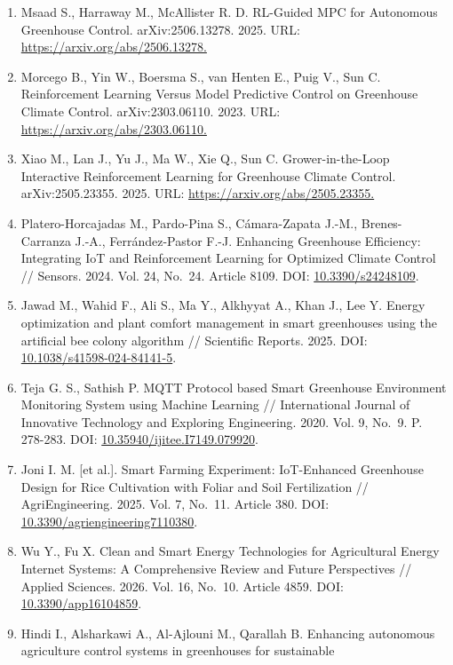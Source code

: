 \documentclass[a4paper,14pt]{extarticle}
\begin{document}
\begin{enumerate}
\item
  Msaad S., Harraway M., McAllister R. D. RL-Guided MPC for Autonomous
  Greenhouse Control. arXiv:2506.13278. 2025. URL:
  \url{https://arxiv.org/abs/2506.13278.}
\item
  Morcego B., Yin W., Boersma S., van Henten E., Puig V., Sun C.
  Reinforcement Learning Versus Model Predictive Control on Greenhouse
  Climate Control. arXiv:2303.06110. 2023. URL:
  \url{https://arxiv.org/abs/2303.06110.}
\item
  Xiao M., Lan J., Yu J., Ma W., Xie Q., Sun C. Grower-in-the-Loop
  Interactive Reinforcement Learning for Greenhouse Climate Control.
  arXiv:2505.23355. 2025. URL: \url{https://arxiv.org/abs/2505.23355.}
\item
  Platero-Horcajadas M., Pardo-Pina S., Cámara-Zapata J.-M.,
  Brenes-Carranza J.-A., Ferrández-Pastor F.-J. Enhancing Greenhouse
  Efficiency: Integrating IoT and Reinforcement Learning for Optimized
  Climate Control // Sensors. 2024. Vol. 24, No.~24. Article 8109. DOI:
  \href{https://doi.org/10.3390/s24248109}{10.3390/s24248109}.
\item
  Jawad M., Wahid F., Ali S., Ma Y., Alkhyyat A., Khan J., Lee Y. Energy
  optimization and plant comfort management in smart greenhouses using
  the artificial bee colony algorithm // Scientific Reports. 2025. DOI:
  \href{https://doi.org/10.1038/s41598-024-84141-5}{10.1038/s41598-024-84141-5}.
\item
  Teja G. S., Sathish P. MQTT Protocol based Smart Greenhouse
  Environment Monitoring System using Machine Learning // International
  Journal of Innovative Technology and Exploring Engineering. 2020. Vol.
  9, No.~9. P. 278-283. DOI:
  \href{https://doi.org/10.35940/ijitee.I7149.079920}{10.35940/ijitee.I7149.079920}.
\item
  Joni I. M. {[}et al.{]}. Smart Farming Experiment: IoT-Enhanced
  Greenhouse Design for Rice Cultivation with Foliar and Soil
  Fertilization // AgriEngineering. 2025. Vol. 7, No.~11. Article 380.
  DOI:
  \href{https://doi.org/10.3390/agriengineering7110380}{10.3390/agriengineering7110380}.
\item
  Wu Y., Fu X. Clean and Smart Energy Technologies for Agricultural
  Energy Internet Systems: A Comprehensive Review and Future
  Perspectives // Applied Sciences. 2026. Vol. 16, No.~10. Article 4859.
  DOI: \href{https://doi.org/10.3390/app16104859}{10.3390/app16104859}.
\item
  Hindi I., Alsharkawi A., Al-Ajlouni M., Qarallah B. Enhancing
  autonomous agriculture control systems in greenhouses for sustainable

\end{enumerate}
\end{document}
